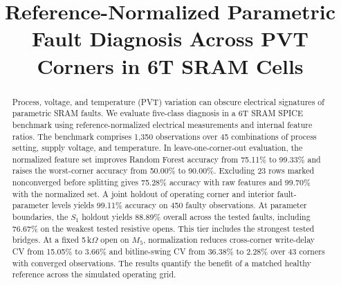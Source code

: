 \documentclass[conference]{IEEEtran}
\begin{document}
\title{Reference-Normalized Parametric Fault Diagnosis Across PVT Corners in 6T SRAM Cells}

\author{
}

\maketitle

\begin{abstract}
Process, voltage, and temperature (PVT) variation can obscure electrical signatures of parametric SRAM faults. We evaluate five-class diagnosis in a 6T SRAM SPICE benchmark using reference-normalized electrical measurements and internal feature ratios. The benchmark comprises 1,350 observations over 45 combinations of process setting, supply voltage, and temperature. In leave-one-corner-out evaluation, the normalized feature set improves Random Forest accuracy from 75.11\% to 99.33\% and raises the worst-corner accuracy from 50.00\% to 90.00\%. Excluding 23 rows marked nonconverged before splitting gives 75.28\% accuracy with raw features and 99.70\% with the normalized set. A joint holdout of operating corner and interior fault-parameter levels yields 99.11\% accuracy on 450 faulty observations. At parameter boundaries, the $S_1$ holdout yields 88.89\% overall across the tested faults, including 76.67\% on the weakest tested resistive opens. This tier includes the strongest tested bridges. At a fixed 5\,k$\Omega$ open on $M_5$, normalization reduces cross-corner write-delay CV from 15.05\% to 3.66\% and bitline-swing CV from 36.38\% to 2.28\% over 43 corners with converged observations. The results quantify the benefit of a matched healthy reference across the simulated operating grid.

\end{abstract}
\end{document}
